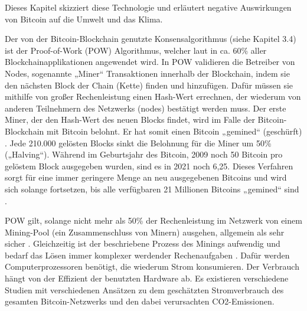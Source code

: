 Dieses Kapitel skizziert diese Technologie und erläutert negative Auswirkungen von Bitcoin auf die Umwelt und das Klima.

Der von der Bitcoin-Blockchain genutzte Konsensalgorithmus (siehe Kapitel 3.4) ist der Proof-of-Work (POW) Algorithmus, welcher laut \cite{andoni_blockchain_2019} in ca. 60\% aller Blockchainapplikationen angewendet wird.  In POW validieren die Betreiber von Nodes, sogenannte „Miner“ Transaktionen innerhalb der Blockchain, indem sie den nächsten Block der Chain (Kette) finden und hinzufügen. Dafür müssen sie mithilfe von großer Rechenleistung einen Hash-Wert errechnen, der wiederum von anderen Teilnehmern des Netzwerks (nodes) bestätigt werden muss. Der erste Miner, der den Hash-Wert des neuen Blocks findet, wird im Falle der Bitcoin-Blockchain mit Bitcoin belohnt. Er hat somit einen Bitcoin „gemined“ (geschürft) \cite{adam_konsensmodelle_2020}. Jede 210.000 gelösten Blocks sinkt die Belohnung für die Miner um 50\% („Halving“). Während im Geburtsjahr des Bitcoin, 2009 noch 50 Bitcoin pro gelöstem Block ausgegeben wurden, sind es in 2021 noch 6,25. Dieses Verfahren sorgt für eine immer geringere Menge an neu ausgegebenen Bitcoins und wird sich solange fortsetzen, bis alle verfügbaren 21 Millionen Bitcoins „gemined“ sind \cite{schar_understanding_2020}. 

POW gilt, solange nicht mehr als 50\% der Rechenleistung im Netzwerk von einem Mining-Pool (ein Zusammenschluss von Minern) ausgehen, allgemein als sehr sicher \cite{gervais_security_2016}. Gleichzeitig ist der beschriebene Prozess des Minings aufwendig und bedarf das Lösen immer komplexer werdender Rechenaufgaben \cite{stoll_carbon_2019}\cite{schinckus_good_2020}. Dafür werden Computerprozessoren benötigt, die wiederum Strom konsumieren. Der Verbrauch hängt von der Effizient der benutzten Hardware ab. Es existieren verschiedene Studien mit verschiedenen Ansätzen zu dem geschätzten Stromverbrauch des gesamten Bitcoin-Netzwerks und den dabei verursachten CO2-Emissionen.

